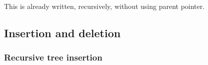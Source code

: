 \documentclass{article}
\begin{document}
This is already written, recursively, without using parent pointer.

\begin{comment}
\subsubsection{Prof. Bunyan's key sorting claim}
\subsubsection{Successor and predecessor for node with 2 children}
\subsubsection{Ancestor nodes}
\subsubsection{In-order walk using minimum and successor}
\subsubsection{Complexity of successive calls to successor}
\subsubsection{Node parent-child key relationship}
\end{comment}


\subsection{Insertion and deletion}

\subsubsection{Recursive tree insertion}

\begin{comment}
\subsubsection{Cost of repeated insertion and searching}
\subsubsection{Cost of sorting with binary search tree}
\subsubsection{Is deletion commutative?}
\subsubsection{Implement search, insert, delete with successor}
\subsubsection{Choose predecessor for delete}
\end{comment}
\end{document}
